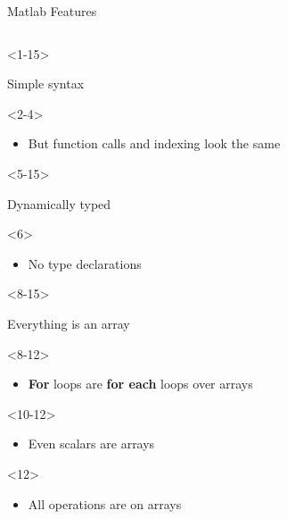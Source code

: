 \begin{frame}[fragile]{Matlab Features}
\begin{columns}
    \begin{column}[T]{5cm}
      \begin{itemize}

        \begin{onlyenv}<1-15>
        \item Simple syntax
          \begin{onlyenv}<2-4>
            \begin{itemize}
            \item But function calls and indexing look the same
            \end{itemize}         
          \end{onlyenv}
        \end{onlyenv}
        
        
        \begin{onlyenv}<5-15>
        \item Dynamically typed
          \begin{onlyenv}<6>
            \begin{itemize}
            \item No type declarations
            \end{itemize}         
          \end{onlyenv}
        \end{onlyenv}

        \begin{onlyenv}<8-15>
        \item Everything is an array
          \begin{onlyenv}<8-12>
            \begin{itemize}
            \item \textbf{For} loops are \textbf{for each} loops over arrays
            \end{itemize}    
          \end{onlyenv}
          \begin{onlyenv}<10-12>
            \begin{itemize}
            \item Even scalars are arrays
            \end{itemize}    
          \end{onlyenv}
          \begin{onlyenv}<12>
            \begin{itemize}
            \item All operations are on arrays
            \end{itemize}    
          \end{onlyenv}
        \end{onlyenv}


\end{itemize}
\end{column}
\end{columns}
\end{frame}
